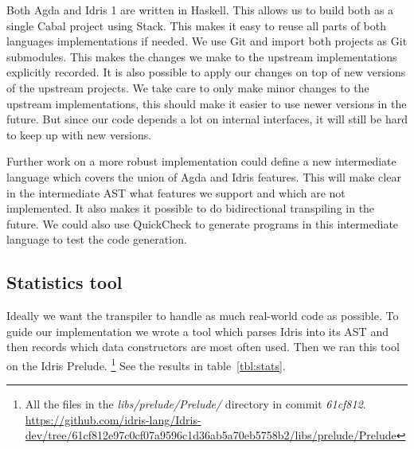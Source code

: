 Both Agda and Idris 1 are written in Haskell.  This allows us to build both as
a single Cabal project using Stack.  This makes it easy to reuse all parts of
both languages implementations if needed.  We use Git and import both projects
as Git submodules. This makes the changes we make to the upstream
implementations explicitly recorded. It is also possible to apply our changes
on top of new versions of the upstream projects.  We take care to only make
minor changes to the upstream implementations, this should make it easier to
use newer versions in the future.  But since our code depends a lot on internal
interfaces, it will still be hard to keep up with new versions.



Further work on a more robust implementation could define a new intermediate
language which covers the union of Agda and Idris features.
This will make clear in the intermediate AST what features we support and which
are not implemented.
It also makes it possible to do bidirectional transpiling in the future.
We could also use QuickCheck to generate programs in this intermediate language
to test the code generation.


\subsection{Statistics tool}
Ideally we want the transpiler to handle as much real-world code as possible.
To guide our implementation we wrote a tool which parses Idris into its AST and
then records which data constructors are most often used. Then we ran this tool
on the Idris Prelude.
\footnote{ All the files in the \textit{libs/prelude/Prelude/} directory in commit \textit{61cf812}.
\url{https://github.com/idris-lang/Idris-dev/tree/61cf812e97c0cf07a9596c1d36ab5a70eb5758b2/libs/prelude/Prelude}}
See the results in table~\ref{tbl:stats}.


